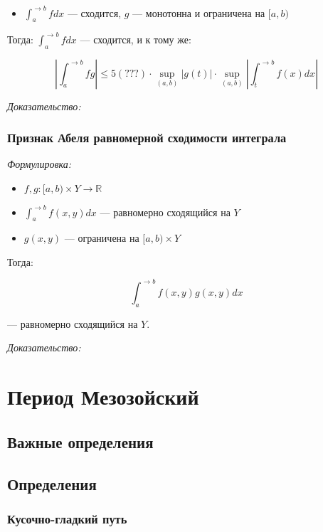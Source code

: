 \documentclass{article}
\begin{document}
\begin{itemize}
    \item $\int_{a}^{\rightarrow b} f dx$ --- сходится, $g$ --- монотонна и ограничена на $[a, b)$
\end{itemize}

Тогда: $\int_{a}^{\rightarrow b} f dx$ --- сходится, и к тому же: 

\[\left|\int_{a}^{\rightarrow b} fg\right| \le 5 (???) \cdot \sup_{(a, b)} \left|g(t)\right| \cdot \sup_{(a, b)} \left|\int_{t}^{\rightarrow b} f(x) dx \right|\]

\textit{Доказательство:}

\subsubsection{Признак Абеля равномерной сходимости интеграла}
\textit{Формулировка:}

\begin{itemize}
    \item $f, g: [a, b) \times Y \rightarrow \mathbb{R}$
    \item $\int_{a}^{\rightarrow b} f(x, y) dx$ --- равномерно сходящийся на $Y$
    \item $g(x, y)$ --- ограничена на $[a, b) \times Y$
\end{itemize}

Тогда:

\[\int_{a}^{\rightarrow b} f(x, y) g(x, y) dx\]

--- равномерно сходящийся на $Y$.

\textit{Доказательство:}

\newpage

\section{Период Мезозойский}
\subsection{Важные определения}

\newpage

\subsection{Определения}

\subsubsection{Кусочно-гладкий путь}
\end{document}

